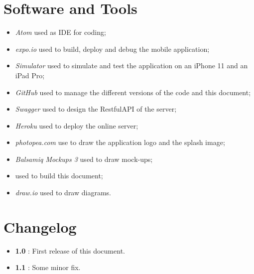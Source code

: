 \section{Software and Tools}
\begin{itemize}
  \item \textit{Atom} used as IDE for coding;
  \item \textit{expo.io} used to build, deploy and debug the mobile application;
  \item \textit{Simulator} used to simulate and test the application on an iPhone 11 and an iPad Pro;
  \item \textit{GitHub} used to manage the different versions of the code and this document;
  \item \textit{Swagger} used to design the RestfulAPI of the server;
  \item \textit{Heroku} used to deploy the online server;
  \item \textit{photopea.com} use to draw the application logo and the splash image;
  \item \textit{Balsamiq Mockups 3} used to draw mock-ups;
  \item \text{\LaTeX} used to build this document;
   \item \textit{draw.io} used to draw diagrams.
\end{itemize}


\section{Changelog} \label{Changelog}
\begin{itemize}
  \item \textbf{1.0} : First release of this document.
  \item \textbf{1.1} : Some minor fix.
\end{itemize}